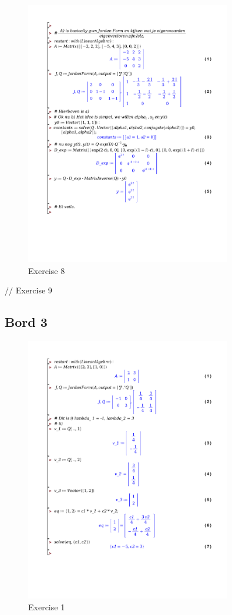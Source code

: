 \documentclass[a4paper]{report}
\begin{document}
\begin{figure}[H]
	\centering
	\includegraphics[width=0.8\textwidth]{exercises/huis_3_ex_8.pdf}
	\caption{Exercise 8}
	\label{fig:huis_3_ex_8}
\end{figure}

// Exercise 9


\subsection*{Bord 3}

\begin{figure}[H]
	\centering
	\includegraphics[width=0.8\textwidth]{exercises/bord_3_ex_1.pdf}
	\caption{Exercise 1}
	\label{fig:bord_3_ex_1}
\end{figure}
\end{document}

